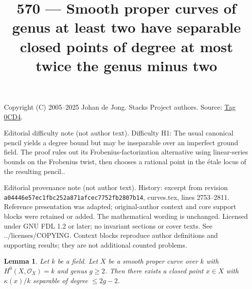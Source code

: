 \documentclass{amsart}
\theoremstyle{plain}
\newtheorem{lemma}[subsection]{Lemma}
\theoremstyle{definition}
\theoremstyle{remark}
\numberwithin{equation}{subsection}
\begin{document}
\title[Stacks Project, Tag 0CD4]{570 --- Smooth proper curves of genus at least two have separable closed points of degree at most twice the genus minus two}
\maketitle
\noindent Copyright (C) 2005--2025 Johan de Jong. Stacks Project authors. Source: \href{https://stacks.math.columbia.edu/tag/0CD4}{Tag 0CD4}.

\noindent Editorial difficulty note (not author text). Difficulty H1: The usual canonical pencil yields a degree bound but may be inseparable over an imperfect ground field. The proof rules out its Frobenius-factorization alternative using linear-series bounds on the Frobenius twist, then chooses a rational point in the étale locus of the resulting pencil..

\noindent Editorial provenance note (not author text). History: excerpt from revision \texttt{a0444\allowbreak 6e57e\allowbreak c1fbc\allowbreak 252a8\allowbreak 71afc\allowbreak ec775\allowbreak 2fb28\allowbreak 07b14}, curves.tex, lines 2753--2811. Reference presentation was adapted; original-author context and core support blocks were retained or added. The mathematical wording is unchanged. Licensed under GNU FDL 1.2 or later; no invariant sections or cover texts. See ../licenses/COPYING. Context blocks reproduce author definitions and supporting results; they are not additional counted problems.

\begin{lemma}
\label{lemma-point-over-separable-extension}
Let $k$ be a field. Let $X$ be a smooth proper curve over $k$
with $H^0(X, \mathcal{O}_X) = k$ and genus $g \geq 2$.
Then there exists a closed point $x \in X$ with
$\kappa(x)/k$ separable of degree $\leq 2g - 2$.
\end{lemma}
\end{document}
